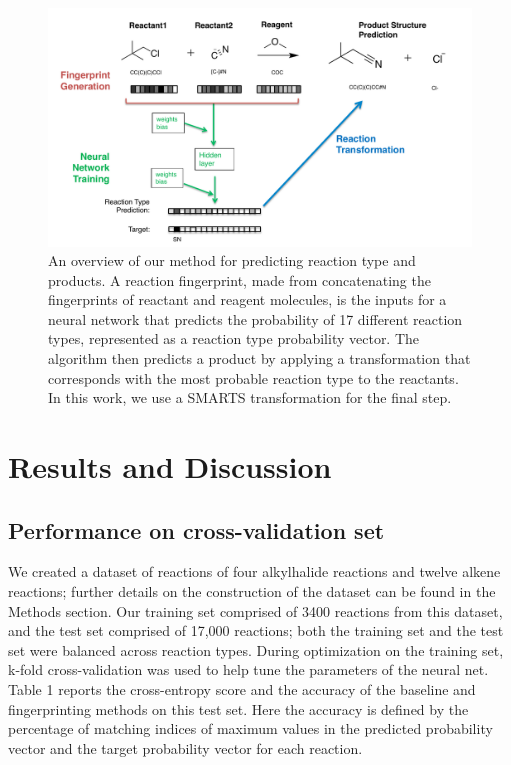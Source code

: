 \begin{figure}
\begin{center}
\includegraphics[width=0.9\columnwidth]{Overview}
\caption{An overview of our method for predicting reaction type and products. A reaction fingerprint, made from concatenating the fingerprints of reactant and reagent molecules, is the inputs for a neural network that predicts the probability of 17 different reaction types, represented as a reaction type probability vector. The algorithm then predicts a product by applying a transformation that corresponds with the most probable reaction type to the reactants. In this work, we use a SMARTS transformation for the final step.}
\label{Fig:PredictionOverview}
\end{center}
\end{figure}

 
\section{Results and Discussion}

\subsection{Performance on cross-validation set}

We created a dataset of reactions of four alkylhalide reactions and twelve alkene reactions; further details on the construction of the dataset can be found in the Methods section. Our training set comprised of 3400 reactions from this dataset, and the test set comprised of 17,000 reactions; both the training set and the test set were balanced across reaction types. During optimization on the training set, k-fold cross-validation was used to help tune the parameters of the neural net. Table 1 reports the cross-entropy score and the accuracy of the baseline and fingerprinting methods on this test set. Here the accuracy is defined by the percentage of matching indices of maximum values in the predicted probability vector and the target probability vector for each reaction.

